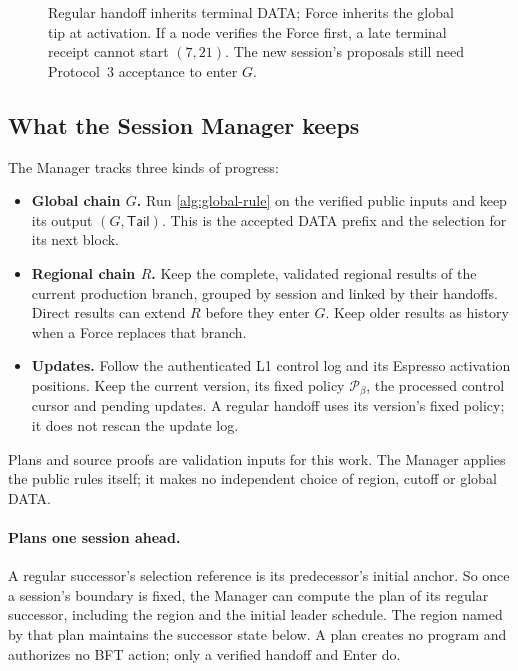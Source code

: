 \documentclass[11pt,a4paper]{article}
\begin{document}
\begin{figure}[tbp]\centering

\caption{Regular handoff inherits terminal DATA; Force inherits the global
tip at activation. If a node verifies the Force first, a late terminal
receipt cannot start $(7,21)$. The new session's proposals still need
Protocol~3 acceptance to enter $G$.}
\label{fig:concurrent-handoffs}
\end{figure}

\subsection{What the Session Manager keeps}
\label{sec:session-manager}
\label{sec:runtime-modules}
The Manager tracks three kinds of progress:
\begin{itemize}
\item \textbf{Global chain $G$.} Run \cref{alg:global-rule} on the
verified public inputs and keep its output $(G,\mathsf{Tail})$.
This is the accepted DATA prefix and the selection for its next block.
\item \textbf{Regional chain $R$.} Keep the complete, validated regional
results of the current production branch, grouped by session and linked
by their handoffs. Direct results can extend $R$ before they enter $G$.
Keep older results as history when a Force replaces that branch.
\item \textbf{Updates.} Follow the authenticated L1 control log and its
Espresso activation positions. Keep the current version, its fixed
policy $\mathcal P_\beta$, the processed control cursor and pending
updates. A regular handoff uses its version's fixed policy; it does not
rescan the update log.
\end{itemize}
Plans and source proofs are validation inputs for this work.
The Manager applies the public rules itself; it makes no independent
choice of region, cutoff or global DATA.

\paragraph{Plans one session ahead.}
A regular successor's selection reference is its predecessor's initial
anchor. So once a session's boundary is fixed, the Manager can compute
the plan of its regular successor, including the region and the initial
leader schedule. The region named by that plan maintains the successor
state below. A plan creates no program and authorizes no BFT action;
only a verified handoff and Enter do.
\end{document}
